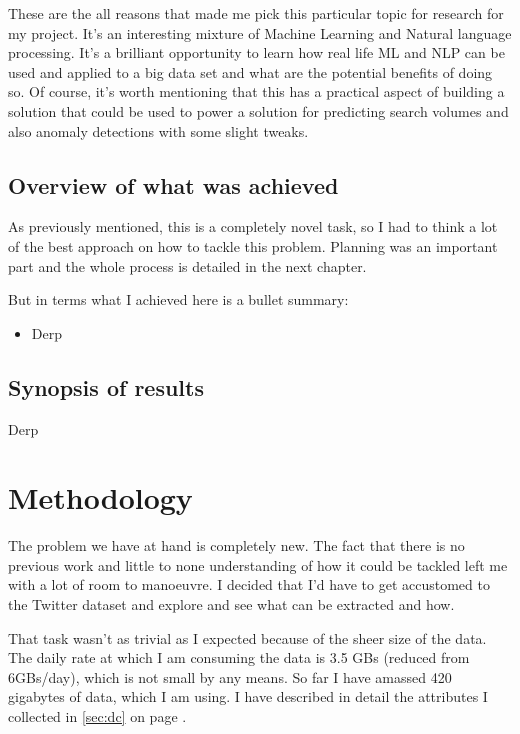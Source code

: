 \documentclass[minf,frontabs,twoside,singlespacing,parskip]{infthesis}
\begin{document}
These are the all reasons that made me pick this particular topic for research for my project. It's an interesting mixture of Machine Learning and Natural language processing. It's a brilliant opportunity to learn how real life ML and NLP can be used and applied to a big data set and what are the potential benefits of doing so. Of course, it's worth mentioning that this has a practical aspect of building a solution that could be used to power a solution for predicting search volumes and also anomaly detections with some slight tweaks. 


\section{Overview of what was achieved}

As previously mentioned, this is a completely novel task, so I had to think a lot of the best approach on how to tackle this problem. Planning was an important part and the whole process is detailed in the next chapter. 

But in terms what I achieved here is a bullet summary:
\begin{itemize}
\item Derp
\end{itemize}


\section{Synopsis of results}

Derp


\chapter{Methodology}
\label{chap:method}

The problem we have at hand is completely new. The fact that there is no previous work and little to none understanding of how it could be tackled left me with a lot of room to manoeuvre. I decided that I'd have to get accustomed to the Twitter dataset and explore and see what can be extracted and how. 

That task wasn't as trivial as I expected because of the sheer size of the data. The daily rate at which I am consuming the data is 3.5 GBs (reduced from 6GBs/day), which is not small by any means. So far I have amassed 420 gigabytes of data, which I am using. I have described in detail the attributes I collected in \ref{sec:dc} on page \pageref{sec:dc}. 
\end{document}
